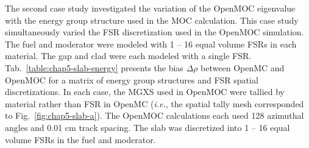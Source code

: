 The second case study investigated the variation of the OpenMOC eigenvalue with the energy group structure used in the \ac{MOC} calculation. This case study simultaneously varied the \ac{FSR} discretization used in the OpenMOC simulation. The fuel and moderator were modeled with 1 -- 16 equal volume \ac{FSR}s in each material. The gap and clad were each modeled with a single \ac{FSR}. Tab.~\ref{table:chap5-slab-energy} presents the bias $\Delta\rho$ between OpenMC and OpenMOC for a matrix of energy group structures and \ac{FSR} spatial discretizations. In each case, the \ac{MGXS} used in OpenMOC were tallied by material rather than \ac{FSR} in OpenMC (\textit{i.e.}, the spatial tally mesh corresponded to Fig.~\ref{fig:chap5-slab-a}). The OpenMOC calculations each used 128 azimuthal angles and 0.01 cm track spacing. The slab was discretized into 1 -- 16 equal volume \ac{FSR}s in the fuel and moderator.

